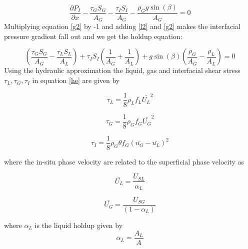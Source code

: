 \documentclass[10pt,a4paper]{report}
\begin{document}
\begin{equation} \label{g2}
\frac{\partial P_{I}}{\partial x}-\frac{\tau_{G}S_{G}}{A_{G}}-\frac{\tau_{I}S_{I}}{A_{G}}-\frac{\rho_{G}g\sin (\beta)}{A_{G}}  = 0
\end{equation}
Multiplying equation \ref{g2} by -1 and adding \ref{l2} and \ref{g2} makes the interfacial pressure gradient fall out and we get the holdup equation:

\begin{equation}\label{he}
\left( \frac{\tau_{G}S_{G}}{A_{G}}-\frac{\tau_{L}S_{L}}{A_{L}}\right)+\tau_{I}S_{I}\left(   \frac{1}{A_{G}}+\frac{1}{A_{L}}   \right)+g\sin(\beta)\left( \frac{\rho_{G}}{A_{G}}-\frac{\rho_{L}}{A_{L}}       \right) = 0
\end{equation} 
Using the hydraulic approximation the liquid, gas and interfacial shear stress $\tau_{L}, \tau_{G}, \tau_{I}$ in equation \ref{he} are given by

\begin{equation}
\tau_{L} = \frac{1}{8}\rho_{L}f_{L}\bar{U_{L}}^{2} \nonumber
\end{equation}

\begin{equation}
\tau_{G} = \frac{1}{8}\rho_{G}f_{G}\bar{U_{G}}^{2} \nonumber
\end{equation}

\begin{equation}
\tau_{I} = \frac{1}{8}\rho_{G}\theta f_{G}(\bar{u_{G}}-\bar{u_{L}})^{2} \nonumber
\end{equation}

where the in-situ phase velocity are related to the superficial phase velocity as

\begin{equation}
\bar{U_{L}} = \frac{U_{SL}}{\alpha_{L}}
\end{equation}

\begin{equation}
\bar{U_{G}} = \frac{U_{SG}}{(1-\alpha_{L})}
\end{equation}

where $\alpha_{L}$ is the liquid holdup given by
\begin{equation}
\alpha_{L} = \frac{A_{L}}{A}
\end{equation}
\end{document}
